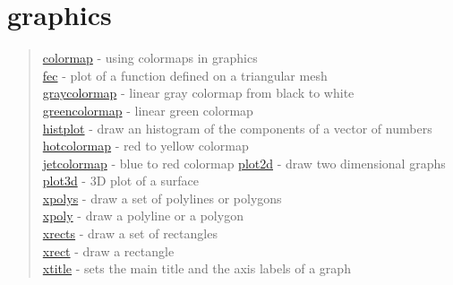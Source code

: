 \chapter*{graphics}

\begin{quote}
\noindent
\hyperlink{colormap}{colormap} - using colormaps in graphics\\
\hyperlink{fec}{fec} -  plot of a function defined on a triangular mesh\\
\hyperlink{graycolormap}{graycolormap} - linear gray colormap from black to white\\
\hyperlink{greencolormap}{greencolormap} - linear green colormap\\
\hyperlink{histplot}{histplot} - draw an histogram of the components of a vector of numbers\\
\hyperlink{hotcolormap}{hotcolormap} - red to yellow colormap\\
\hyperlink{jetcolormap}{jetcolormap} - blue to red colormap
\hyperlink{plot2d}{plot2d} - draw two dimensional graphs\\
\hyperlink{plot3d}{plot3d} - 3D plot of a surface \\
\hyperlink{xpolys}{xpolys} - draw a set of polylines or polygons \\
\hyperlink{xpoly}{xpoly} - draw a polyline or a polygon \\
\hyperlink{xrects}{xrects} - draw a set of rectangles\\
\hyperlink{xrect}{xrect} - draw a rectangle\\
\hyperlink{xtitle}{xtitle} - sets the main title and the axis labels of a graph\\
\end{quote}












